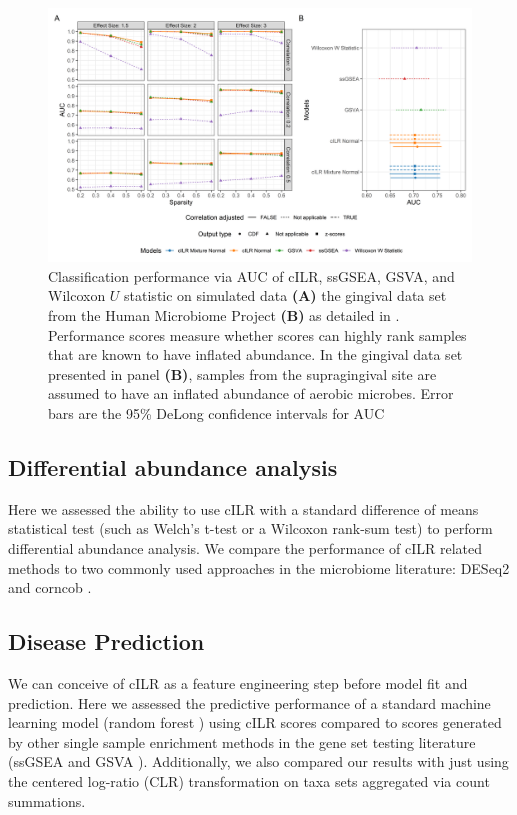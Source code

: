 \documentclass{article}
\begin{document}
\begin{figure}[H]
    \centering
    \includegraphics[width = \textwidth]{figures/sim_data_ss_auc.png}
    \caption{Classification performance via AUC of cILR, ssGSEA, GSVA, and Wilcoxon $U$ statistic on simulated data \textbf{(A)} the gingival data set from the Human Microbiome Project  \textbf{(B)} as detailed in . Performance scores measure whether scores can highly rank samples that are known to have inflated abundance. In the gingival data set presented in panel \textbf{(B)}, samples from the supragingival site are assumed to have an inflated abundance of aerobic microbes. Error bars are the 95\% DeLong confidence intervals for AUC \cite{delong1988}} 
    \label{fig:ss_auc}
\end{figure}

\subsection*{Differential abundance analysis}
Here we assessed the ability to use cILR with a standard difference of means statistical test (such as Welch's t-test or a Wilcoxon rank-sum test) to perform differential abundance analysis. We compare the performance of cILR related methods to two commonly used approaches in the microbiome literature: DESeq2 \cite{love2014} and corncob \cite{martin2020}.   

\subsection*{Disease Prediction} 
We can conceive of cILR as a feature engineering step before model fit and prediction. Here we assessed the predictive performance of a standard machine learning model (random forest \cite{breiman2001}) using cILR scores compared to scores generated by other single sample enrichment methods in the gene set testing literature (ssGSEA \cite{barbie2009} and GSVA \cite{hanzelmann2013}). Additionally, we also compared our results with just using the centered log-ratio (CLR) transformation on taxa sets aggregated via count summations.    
\end{document}
